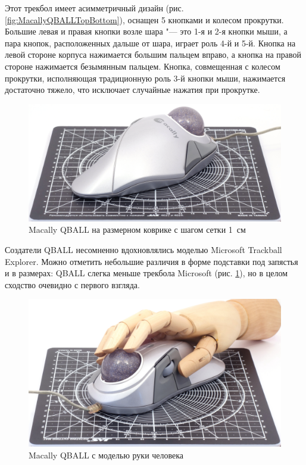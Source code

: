 \documentclass[11pt, a4paper]{article}
\begin{document}
Этот трекбол имеет асимметричный дизайн (рис. \ref{fig:MacallyQBALLTopBottom}), оснащен 5 кнопками и колесом прокрутки.
Большие левая и правая кнопки возле шара "--- это 1-я и 2-я кнопки мыши, а пара кнопок, расположенных дальше от шара, играет роль 4-й и 5-й.
Кнопка на левой стороне корпуса нажимается большим пальцем вправо, а кнопка на правой стороне нажимается безымянным пальцем. Кнопка, совмещенная с колесом прокрутки, исполняющая традиционную роль 3-й кнопки мыши, нажимается достаточно тяжело, что исключает случайные нажатия при прокрутке.

\begin{figure}[h]
    \centering
    \includegraphics[scale=0.5]{2001_macally_qball/size_30.jpg}
    \caption{Macally QBALL на размерном коврике с шагом сетки 1~см}
    \label{fig:MacallyQBALLSize}
\end{figure}

Создатели QBALL несомненно вдохновлялись моделью Microsoft Trackball Explorer. Можно отметить небольшие различия в форме подставки под запястья и в размерах: QBALL слегка меньше трекбола Microsoft (рис. \ref{fig:MacallyQBALLSize}), но в целом сходство очевидно с первого взгляда.


\begin{figure}[h]
    \centering
    \includegraphics[scale=0.5]{2001_macally_qball/hand_30.jpg}
    \caption{Macally QBALL с моделью руки человека}
    \label{fig:MacallyQBALLHand}
\end{figure}
\end{document}
